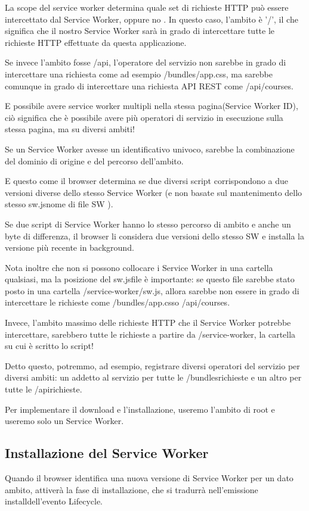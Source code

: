 \documentclass[italian]{article}
\begin{document}
La scope del service worker determina quale set di richieste HTTP può essere intercettato dal Service Worker, oppure no . In questo caso, l'ambito è '/', il che significa che il nostro Service Worker sarà in grado di intercettare tutte le richieste HTTP effettuate da questa applicazione.

Se invece l'ambito fosse /api, l'operatore del servizio non sarebbe in grado di intercettare una richiesta come ad esempio /bundles/app.css, ma sarebbe comunque in grado di intercettare una richiesta API REST come /api/courses.

E possibile avere service worker multipli nella stessa pagina(Service Worker ID), ciò significa che è possibile avere più operatori di servizio in esecuzione sulla stessa pagina, ma su diversi ambiti!

Se un Service Worker avesse un identificativo univoco, sarebbe la combinazione del dominio di origine e del percorso dell'ambito.

E questo come il browser determina se due diversi script corrispondono a due versioni diverse dello stesso Service Worker (e non basate sul mantenimento dello stesso sw.jsnome di file SW ).

Se due script di Service Worker hanno lo stesso percorso di ambito e anche un byte di differenza, il browser li considera due versioni dello stesso SW e installa la versione più recente in background.

Nota inoltre che non si possono collocare i Service Worker in una cartella qualsiasi, ma la posizione del sw.jsfile è importante: se questo file sarebbe stato posto in una cartella /service-worker/sw.js, allora sarebbe non essere in grado di intercettare le richieste come /bundles/app.csso /api/courses.

Invece, l'ambito massimo delle richieste HTTP che il Service Worker potrebbe intercettare, sarebbero tutte le richieste a partire da /service-worker, la cartella su cui è scritto lo script!

Detto questo, potremmo, ad esempio, registrare diversi operatori del servizio per diversi ambiti: un addetto al servizio per tutte le /bundlesrichieste e un altro per tutte le /apirichieste.

Per implementare il download e l'installazione, useremo l'ambito di root e useremo solo un Service Worker.

\subsection{Installazione del Service Worker}
Quando il browser identifica una nuova versione di Service Worker per un dato ambito, attiverà la fase di installazione, che si tradurrà nell'emissione installdell'evento Lifecycle.
\end{document}
